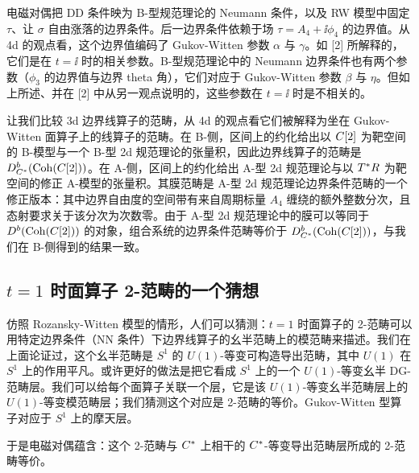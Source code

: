 电磁对偶把 DD 条件映为 B-型规范理论的 Neumann 条件，以及 RW 模型中固定 $\tau$、让 $\sigma$ 自由涨落的边界条件。后一边界条件依赖于场 $\tau=A_4+\ii\phi_4$ 的边界值。从 4d 的观点看，这个边界值编码了 Gukov-Witten 参数 $\alpha$ 与 $\gamma$。如 [2] 所解释的，它们是在 $t=\ii$ 时的相关参数。B-型规范理论中的 Neumann 边界条件也有两个参数（$\phi_3$ 的边界值与边界 theta 角），它们对应于 Gukov-Witten 参数 $\beta$ 与 $\eta$。但如上所述、并在 [2] 中从另一观点说明的，这些参数在 $t=\ii$ 时是不相关的。

让我们比较 3d 边界线算子的范畴，从 4d 的观点看它们被解释为坐在 Gukov-Witten 面算子上的线算子的范畴。在 B-侧，区间上的约化给出以 $C[2]$ 为靶空间的 B-模型与一个 B-型 2d 规范理论的张量积，因此边界线算子的范畴是 $D^b_{C^*}(\mathrm{Coh}(C[2]))$。在 A-侧，区间上的约化给出 A-型 2d 规范理论与以 $T^*R$ 为靶空间的修正 A-模型的张量积。其膜范畴是 A-型 2d 规范理论边界条件范畴的一个修正版本：其中边界自由度的空间带有来自周期标量 $A_4$ 缠绕的额外整数分次，且态射要求关于该分次为次数零。由于 A-型 2d 规范理论中的膜可以等同于 $D^b(\mathrm{Coh}(C[2]))$ 的对象，组合系统的边界条件范畴等价于 $D^b_{C^*}(\mathrm{Coh}(C[2]))$，与我们在 B-侧得到的结果一致。

\subsection{\texorpdfstring{$t=1$}{t=1} 时面算子 2-范畴的一个猜想}

仿照 Rozansky-Witten 模型的情形，人们可以猜测：$t=1$ 时面算子的 2-范畴可以用特定边界条件（NN 条件）下边界线算子的幺半范畴上的模范畴来描述。我们在上面论证过，这个幺半范畴是 $S^1$ 的 $U(1)$-等变可构造导出范畴，其中 $U(1)$ 在 $S^1$ 上的作用平凡。或许更好的做法是把它看成 $S^1$ 上的一个 $U(1)$-等变幺半 DG-范畴层。我们可以给每个面算子关联一个层，它是该 $U(1)$-等变幺半范畴层上的 $U(1)$-等变模范畴层；我们猜测这个对应是 2-范畴的等价。Gukov-Witten 型算子对应于 $S^1$ 上的摩天层。

于是电磁对偶蕴含：这个 2-范畴与 $C^*$ 上相干的 $C^*$-等变导出范畴层所成的 2-范畴等价。


